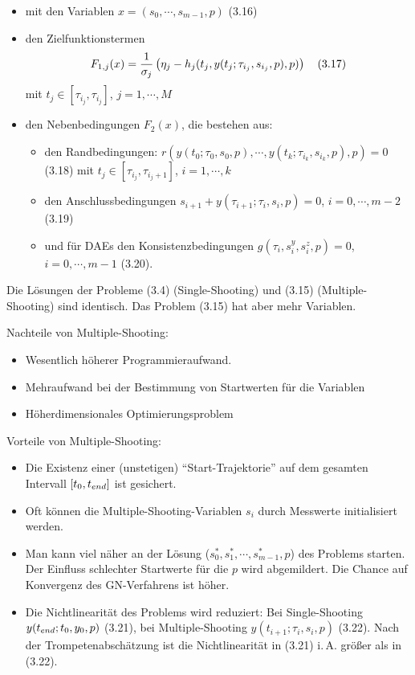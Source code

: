 \begin{itemize}
\item mit den Variablen $x = (s_0,\cdots,s_{m-1}, p)$ (3.16)
\item den Zielfunktionstermen
\[ F_{1,j} (x) = \frac 1{\sigma_j} \left( \eta_j - h_j(t_j,y(t_j; \tau_{i_j}, s_{i_j}, p), p) \right)  \quad (3.17) \]
mit $t_j \in [\tau_{i_j}, \tau_{i_j}]$, $j=1,\cdots,M$
\item den Nebenbedingungen $F_2(x)$, die bestehen aus:
\begin{itemize}
\item den Randbedingungen: $r(y(t_0;\tau_0,s_0,p),\cdots,y(t_k;\tau_{i_k},s_{i_k},p), p) = 0 $ (3.18) mit $t_j \in [\tau_{i_j},\tau_{i_j + 1}]$, $i=1,\cdots,k$
\item den Anschlussbedingungen $s_{i+1}+y(\tau_{i+1};\tau_i,s_i,p)=0$, $i=0,\cdots,m-2$ (3.19)
\item und für DAEs den Konsistenzbedingungen  $g(\tau_i, s_i^y, s_i^z,p)=0$, $i=0,\cdots,m-1$ (3.20).
\end{itemize}
\end{itemize}

Die Lösungen der Probleme (3.4) (Single-Shooting) und (3.15) (Multiple-Shooting) sind identisch. Das Problem (3.15) hat aber mehr Variablen.

Nachteile von Multiple-Shooting:

\begin{itemize}
\item Wesentlich höherer Programmieraufwand.
\item Mehraufwand bei der Bestimmung von Startwerten für die Variablen
\item Höherdimensionales Optimierungsproblem
\end{itemize}

Vorteile von Multiple-Shooting:

\begin{itemize}
\item Die Existenz einer (unstetigen) "`Start-Trajektorie"' auf dem gesamten Intervall $[t_0,t_{end}]$ ist gesichert.
\item Oft können die Multiple-Shooting-Variablen $s_i$ durch Messwerte initialisiert werden.
\item Man kann viel näher an der Lösung ($s_0^*,s_1^*,\cdots,s_{m-1}^*, p$) des Problems starten. Der Einfluss schlechter Startwerte für die $p$ wird abgemildert. Die Chance auf Konvergenz des GN-Verfahrens ist höher.
\item Die Nichtlinearität des Problems wird reduziert: Bei Single-Shooting $y(t_{end}; t_0,y_0,p)$ (3.21), bei Multiple-Shooting $y(t_{i+1};\tau_i,s_i,p)$ (3.22). Nach der Trompetenabschätzung ist die Nichtlinearität in (3.21) i.\,A. größer als in (3.22).
\end{itemize}

